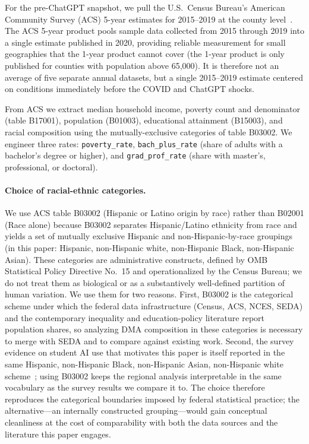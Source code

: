 \documentclass[11pt]{article}
\begin{document}
For the pre-ChatGPT snapshot, we pull the U.S.\ Census Bureau's American Community Survey (ACS) 5-year estimates for 2015--2019 at the county level~\citep{acs2019}. The ACS 5-year product pools sample data collected from 2015 through 2019 into a single estimate published in 2020, providing reliable measurement for small geographies that the 1-year product cannot cover (the 1-year product is only published for counties with population above 65{,}000). It is therefore not an average of five separate annual datasets, but a single 2015--2019 estimate centered on conditions immediately before the COVID and ChatGPT shocks.

From ACS we extract median household income, poverty count and denominator (table B17001), population (B01003), educational attainment (B15003), and racial composition using the mutually-exclusive categories of table B03002. We engineer three rates: \texttt{poverty\_rate}, \texttt{bach\_plus\_rate} (share of adults with a bachelor's degree or higher), and \texttt{grad\_prof\_rate} (share with master's, professional, or doctoral).

\paragraph{Choice of racial-ethnic categories.}
We use ACS table B03002 (Hispanic or Latino origin by race) rather than B02001 (Race alone) because B03002 separates Hispanic/Latino ethnicity from race and yields a set of mutually exclusive Hispanic and non-Hispanic-by-race groupings (in this paper: Hispanic, non-Hispanic white, non-Hispanic Black, non-Hispanic Asian). These categories are administrative constructs, defined by OMB Statistical Policy Directive No.\ 15 and operationalized by the Census Bureau; we do not treat them as biological or as a substantively well-defined partition of human variation. We use them for two reasons. First, B03002 is the categorical scheme under which the federal data infrastructure (Census, ACS, NCES, SEDA) and the contemporary inequality and education-policy literature report population shares, so analyzing DMA composition in these categories is necessary to merge with SEDA and to compare against existing work. Second, the survey evidence on student AI use that motivates this paper is itself reported in the same Hispanic, non-Hispanic Black, non-Hispanic Asian, non-Hispanic white scheme~\citep{sidoti2025,pew2026}; using B03002 keeps the regional analysis interpretable in the same vocabulary as the survey results we compare it to. The choice therefore reproduces the categorical boundaries imposed by federal statistical practice; the alternative---an internally constructed grouping---would gain conceptual cleanliness at the cost of comparability with both the data sources and the literature this paper engages.
\end{document}
